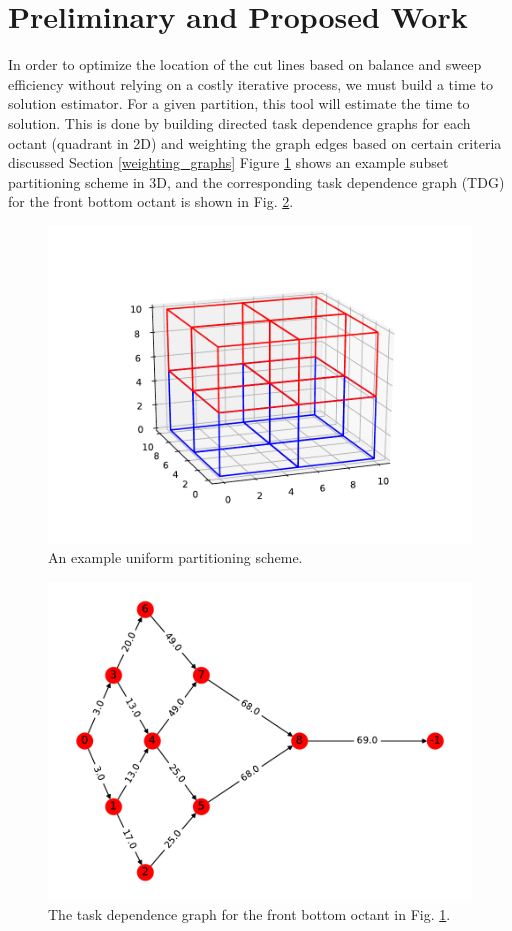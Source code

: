\documentclass[11pt, letterpaper,titlepage,oneside]{article}
\begin{document}
\section{Preliminary and Proposed Work}

In order to optimize the location of the cut lines based on balance and sweep efficiency without relying on a costly iterative process, we must build a time to solution estimator. For a given partition, this tool will estimate the time to solution. This is done by building directed task dependence graphs for each octant (quadrant in 2D) and weighting the graph edges based on certain criteria discussed Section \ref{weighting_graphs} Figure \ref{subset_plot} shows an example subset partitioning scheme in 3D, and the corresponding task dependence graph (TDG) for the front bottom octant is shown in Fig. \ref{digraph}.

\begin{figure}[H]
\centering
\includegraphics{../figures/subset_plot.pdf}
\caption{An example uniform partitioning scheme.}
\label{subset_plot}
\end{figure}

\begin{figure}[H]
\centering
\includegraphics{../figures/digraph.pdf}
\caption{The task dependence graph for the front bottom octant in Fig. \ref{subset_plot}.}
\label{digraph}
\end{figure}
\end{document}

